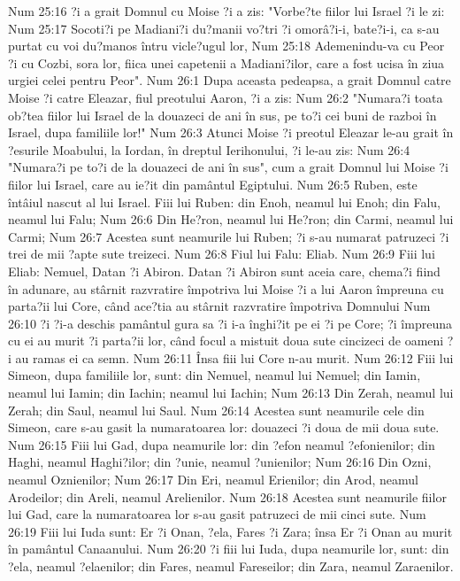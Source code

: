 Num 25:16  ?i a grait Domnul cu Moise ?i a zis: "Vorbe?te fiilor lui Israel ?i le zi:
Num 25:17  Socoti?i pe Madiani?i du?manii vo?tri ?i omorâ?i-i, bate?i-i, ca s-au purtat cu voi du?manos întru vicle?ugul lor,
Num 25:18  Ademenindu-va cu Peor ?i cu Cozbi, sora lor, fiica unei capetenii a Madiani?ilor, care a fost ucisa în ziua urgiei celei pentru Peor".
Num 26:1  Dupa aceasta pedeapsa, a grait Domnul catre Moise ?i catre Eleazar, fiul preotului Aaron, ?i a zis:
Num 26:2  "Numara?i toata ob?tea fiilor lui Israel de la douazeci de ani în sus, pe to?i cei buni de razboi în Israel, dupa familiile lor!"
Num 26:3  Atunci Moise ?i preotul Eleazar le-au grait în ?esurile Moabului, la Iordan, în dreptul Ierihonului, ?i le-au zis:
Num 26:4  "Numara?i pe to?i de la douazeci de ani în sus", cum a grait Domnul lui Moise ?i fiilor lui Israel, care au ie?it din pamântul Egiptului.
Num 26:5  Ruben, este întâiul nascut al lui Israel. Fiii lui Ruben: din Enoh, neamul lui Enoh; din Falu, neamul lui Falu;
Num 26:6  Din He?ron, neamul lui He?ron; din Carmi, neamul lui Carmi;
Num 26:7  Acestea sunt neamurile lui Ruben; ?i s-au numarat patruzeci ?i trei de mii ?apte sute treizeci.
Num 26:8  Fiul lui Falu: Eliab.
Num 26:9  Fiii lui Eliab: Nemuel, Datan ?i Abiron. Datan ?i Abiron sunt aceia care, chema?i fiind în adunare, au stârnit razvratire împotriva lui Moise ?i a lui Aaron împreuna cu parta?ii lui Core, când ace?tia au stârnit razvratire împotriva Domnului
Num 26:10  ?i ?i-a deschis pamântul gura sa ?i i-a înghi?it pe ei ?i pe Core; ?i împreuna cu ei au murit ?i parta?ii lor, când focul a mistuit doua sute cincizeci de oameni ?i au ramas ei ca semn.
Num 26:11  Însa fiii lui Core n-au murit.
Num 26:12  Fiii lui Simeon, dupa familiile lor, sunt: din Nemuel, neamul lui Nemuel; din Iamin, neamul lui Iamin; din Iachin; neamul lui Iachin;
Num 26:13  Din Zerah, neamul lui Zerah; din Saul, neamul lui Saul.
Num 26:14  Acestea sunt neamurile cele din Simeon, care s-au gasit la numaratoarea lor: douazeci ?i doua de mii doua sute.
Num 26:15  Fiii lui Gad, dupa neamurile lor: din ?efon neamul ?efonienilor; din Haghi, neamul Haghi?ilor; din ?unie, neamul ?unienilor;
Num 26:16  Din Ozni, neamul Oznienilor;
Num 26:17  Din Eri, neamul Erienilor; din Arod, neamul Arodeilor; din Areli, neamul Arelienilor.
Num 26:18  Acestea sunt neamurile fiilor lui Gad, care la numaratoarea lor s-au gasit patruzeci de mii cinci sute.
Num 26:19  Fiii lui Iuda sunt: Er ?i Onan, ?ela, Fares ?i Zara; însa Er ?i Onan au murit în pamântul Canaanului.
Num 26:20  ?i fiii lui Iuda, dupa neamurile lor, sunt: din ?ela, neamul ?elaenilor; din Fares, neamul Fareseilor; din Zara, neamul Zaraenilor.
